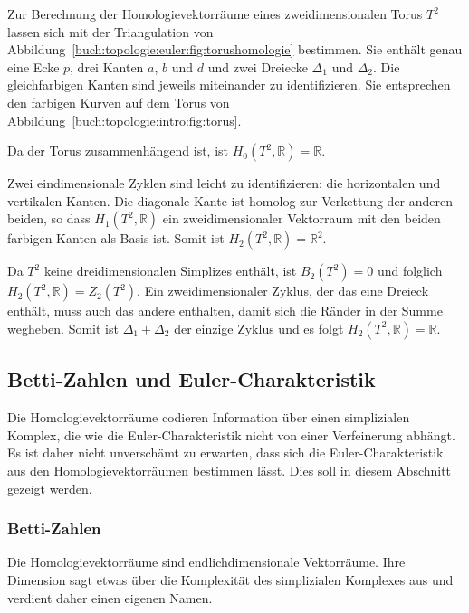 \begin{beispiel}
\label{buch:topologie:euler:beispiel:torus}
Zur Berechnung der Homologievektorräume eines zweidimensionalen
Torus $T^2$ lassen sich mit der Triangulation von
Abbildung~\ref{buch:topologie:euler:fig:torushomologie} bestimmen.
Sie enthält genau eine Ecke $p$, drei Kanten $a$, $b$ und $d$ und
zwei Dreiecke $\Delta_1$ und $\Delta_2$.
Die gleichfarbigen Kanten sind jeweils miteinander zu identifizieren.
Sie entsprechen den farbigen Kurven auf dem Torus von
Abbildung~\ref{buch:topologie:intro:fig:torus}.

Da der Torus zusammenhängend ist, ist $H_0(T^2,\mathbb{R})=\mathbb{R}$.

Zwei eindimensionale Zyklen sind leicht zu identifizieren: die 
horizontalen und vertikalen Kanten.
Die diagonale Kante ist homolog zur Verkettung der anderen beiden,
so dass $H_1(T^2,\mathbb{R})$ ein zweidimensionaler Vektorraum
mit den beiden farbigen Kanten als Basis ist.
Somit ist $H_2(T^2,\mathbb{R})=\mathbb{R}^2$.

Da $T^2$ keine dreidimensionalen Simplizes enthält, ist $B_2(T^2)=0$
und folglich $H_2(T^2,\mathbb{R}) = Z_2(T^2)$.
Ein zweidimensionaler Zyklus, der das eine Dreieck enthält, muss auch
das andere enthalten, damit sich die Ränder in der Summe wegheben.
Somit ist $\Delta_1 + \Delta_2$ der einzige Zyklus und es folgt
$H_2(T^2,\mathbb{R})=\mathbb{R}$.
\end{beispiel}

%
%
\subsection{Betti-Zahlen und Euler-Charakteristik
\label{buch:topologie:simplex:subsection:betti-euler}}
Die Homologievektorräume codieren Information über einen simplizialen
Komplex, die wie die Euler-Charakteristik nicht von einer Verfeinerung
abhängt.
Es ist daher nicht unverschämt zu erwarten, dass sich die Euler-Charakteristik
aus den Homologievektorräumen bestimmen lässt.
Dies soll in diesem Abschnitt gezeigt werden.

%
%
\subsubsection{Betti-Zahlen}
Die Homologievektorräume sind endlichdimensionale Vektorräume.
Ihre Dimension sagt etwas über die Komplexität des simplizialen
Komplexes aus und verdient daher einen eigenen Namen.

